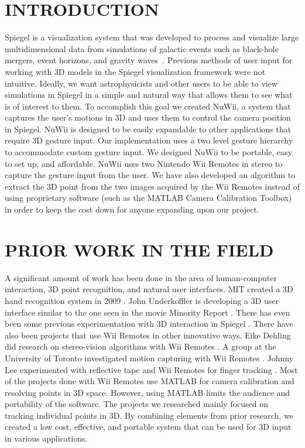 \documentclass[a4paper,twoside]{article}
\begin{document}
\onecolumn \maketitle \normalsize \vfill
 
\section{\uppercase{Introduction}}
\label{sec:introduction}
\noindent Spiegel is a visualization system that was developed to process and visualize large multidimensional data from simulations of galactic events such as black-hole mergers, event horizons, and gravity waves~\cite{Bischof1:2010:Misc,Bischof06}. Previous methods of user input for working with 3D models in the Spiegel visualization framework were not intuitive. Ideally, we want astrophysicists and other users to be able to view simulations in Spiegel in a simple and natural way that allows them to see what is of interest to them. To accomplish this goal we created NuWii, a system that captures the user's motions in 3D and uses them to control the camera position in Spiegel. NuWii is designed to be easily expandable to other applications that require 3D gesture input. Our implementation uses a two level gesture hierarchy to accommodate custom gesture input. We designed NuWii to be portable, easy to set up, and affordable. NuWii uses two Nintendo Wii Remotes in stereo to capture the gesture input from the user. We have also developed an algorithm to extract the 3D point from the two images acquired by the Wii Remotes instead of using proprietary software (such as the MATLAB Camera Calibration Toolbox) in order to keep the cost down for anyone expanding upon our project. 
  
\section{\uppercase{Prior Work in the Field}}
\noindent  A significant amount of work has been done in the area of human-computer interaction, 3D point recognition, and natural user interfaces. MIT created a 3D hand recognition system in 2009 \cite{Wang09}. John Underkoffler is developing a 3D user interface similar to the one seen in the movie Minority Report \cite{Underkoffler10}. There has even been some previous experimentation with 3D interaction in Spiegel \cite{Bak04}. There have also been projects that use Wii Remotes in other innovative ways. Eike Dehling did research on stereo-vision algorithms with Wii Remotes \cite{Dehling08}. A group at the University of Toronto investigated motion capturing with Wii Remotes \cite{Wang08}. Johnny Lee experimented with reflective tape and Wii Remotes for finger tracking  \cite{Lee08}. Most of the projects done with Wii Remotes use MATLAB for camera calibration and resolving points in 3D space. However, using MATLAB limits the audience and portability of the software. The projects we researched mainly focused on tracking individual points in 3D. By combining elements from prior research, we created a low cost, effective, and portable system that can be used for 3D input in various applications. 
\end{document}
